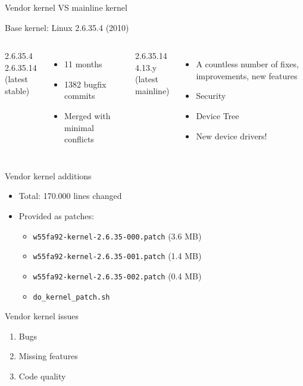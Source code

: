 \documentclass[xetex,table,aspectratio=169]{beamer}
\begin{document}
\begin{frame}{Vendor kernel VS mainline kernel}
  \begin{center}
  Base kernel: Linux 2.6.35.4 (2010)
  \end{center}

  \vspace{0.1\textheight}

  \begin{columns}
    2.6.35.4 \textrightarrow{} 2.6.35.14\\
    (latest stable)
    \begin{itemize}
    \item 11 months
    \item 1382 bugfix commits
    \item Merged with minimal conflicts
    \end{itemize}

    2.6.35.14 \textrightarrow{} 4.13.y\\
    (latest mainline)
    \begin{itemize}
    \item A countless number of fixes, improvements, new features
    \item Security
    \item Device Tree
    \item New device drivers!
    \end{itemize}
  \end{columns}
\end{frame}

\begin{frame}{Vendor kernel additions}
  \begin{itemize}
  \item Total: 170.000 lines changed
  \item Provided as patches:
    \begin{itemize}
    \item \texttt{w55fa92-kernel-2.6.35-000.patch} (3.6 MB)
    \item \texttt{w55fa92-kernel-2.6.35-001.patch} (1.4 MB)
    \item \texttt{w55fa92-kernel-2.6.35-002.patch} (0.4 MB)
    \item \texttt{do\_kernel\_patch.sh}
    \end{itemize}
  \end{itemize}
\end{frame}

\begin{frame}{Vendor kernel issues}
  \begin{enumerate}
  \item Bugs
  \item Missing features
  \item Code quality
  \end{enumerate}
\end{frame}
\end{document}
